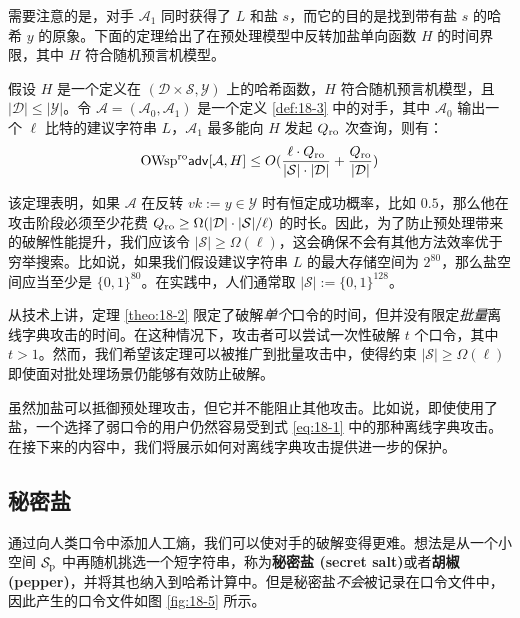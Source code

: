 需要注意的是，对手 $\mathcal{A}_1$ 同时获得了 $L$ 和盐 $s$，而它的目的是找到带有盐 $s$ 的哈希 $y$ 的原象。下面的定理给出了在预处理模型中反转加盐单向函数 $H$ 的时间界限，其中 $H$ 符合随机预言机模型。

\begin{theorem}\label{theo:18-2}
	假设 $H$ 是一个定义在 $(\mathcal{D}\times\mathcal{S},\mathcal{Y})$ 上的哈希函数，$H$ 符合随机预言机模型，且 $|\mathcal{D}|\leq|\mathcal{Y}|$。令 $\mathcal{A}=(\mathcal{A}_0,\mathcal{A}_1)$ 是一个定义 \ref{def:18-3} 中的对手，其中 $\mathcal{A}_0$ 输出一个 $\ell$ 比特的建议字符串 $L$，$\mathcal{A}_1$ 最多能向 $H$ 发起 $Q_{\rm ro}$ 次查询，则有：
	\begin{equation}
	{\rm OWsp^{ro}\mathsf{adv}}[\mathcal{A},H]
	\leq
	O(\frac{\ell\cdot Q_{\rm ro}}{|\mathcal{S}|\cdot |\mathcal{D}|}+\frac{Q_{\rm ro}}{|\mathcal{D}|})	
	\end{equation}
\end{theorem}

该定理表明，如果 $\mathcal{A}$ 在反转 $vk:=y\in\mathcal{Y}$ 时有恒定成功概率，比如 $0.5$，那么他在攻击阶段必须至少花费 $Q_{\rm ro}\geq\Omega({|\mathcal{D}|\cdot|\mathcal{S}|}/{\ell})$ 的时长。因此，为了防止预处理带来的破解性能提升，我们应该令 $|\mathcal{S}|\geq\Omega(\ell)$，这会确保不会有其他方法效率优于穷举搜索。比如说，如果我们假设建议字符串 $L$ 的最大存储空间为 $2^{80}$，那么盐空间应当至少是 $\{0,1\}^{80}$。在实践中，人们通常取 $|\mathcal{S}|:=\{0,1\}^{128}$。

从技术上讲，定理 \ref{theo:18-2} 限定了破解\emph{单个}口令的时间，但并没有限定\emph{批量}离线字典攻击的时间。在这种情况下，攻击者可以尝试一次性破解 $t$ 个口令，其中$t>1$。然而，我们希望该定理可以被推广到批量攻击中，使得约束 $|\mathcal{S}|\geq\Omega(\ell)$ 即使面对批处理场景仍能够有效防止破解。

\begin{snote}[加盐的局限性.]
虽然加盐可以抵御预处理攻击，但它并不能阻止其他攻击。比如说，即使使用了盐，一个选择了弱口令的用户仍然容易受到式 \ref{eq:18-1}  中的那种离线字典攻击。在接下来的内容中，我们将展示如何对离线字典攻击提供进一步的保护。
\end{snote}

\subsection{秘密盐}

通过向人类口令中添加人工熵，我们可以使对手的破解变得更难。想法是从一个小空间 $\mathcal{S}_{\rm p}$ 中再随机挑选一个短字符串，称为\textbf{秘密盐 (secret salt)}或者\textbf{胡椒 (pepper)}，并将其也纳入到哈希计算中。但是秘密盐\emph{不会}被记录在口令文件中，因此产生的口令文件如图 \ref{fig:18-5} 所示。

